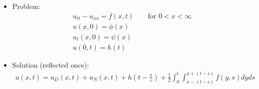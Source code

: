 \documentclass[12pt, a4paper]{article}
\begin{document}
\begin{itemize}
    \item Problem:
    \begin{gather*}
        u_{tt} - u_{xx} = f(x, t) \qquad\text{for }0<x<\infty\\
        u(x, 0) = \phi(x)\\
        u_t(x,0) = \psi(x)\\
        u(0, t)= h(t)
    \end{gather*}
    \item Solution (reflected once):
    \begin{gather*}
        u(x, t) = u_D(x, t) + u_N(x, t) + h(t-\frac{x}{c})+\frac{1}{2} \int_0^t\int_{x-(t-s)}^{x+(t-s)}f(y, s)dyds
    \end{gather*}
\end{itemize}
\vspace{0.3em}
\end{document}
